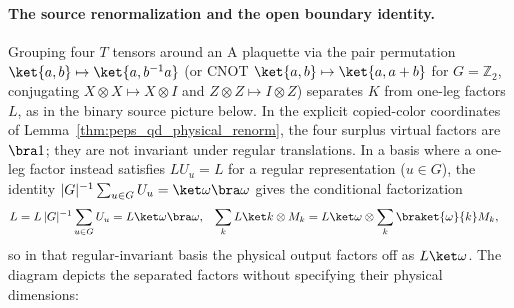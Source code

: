 \paragraph{The source renormalization and the open boundary identity.}
Grouping four $T$ tensors around an A plaquette via the pair permutation $\ket{a,b}\mapsto\ket{a,b^{-1}a}$ (or CNOT $\ket{a,b}\mapsto\ket{a,a+b}$ for $G=\mathbb Z_2$, conjugating $X\otimes X\mapsto X\otimes I$ and $Z\otimes Z\mapsto I\otimes Z$) separates $K$ from one-leg factors $L$, as in the binary source picture below. In the explicit copied-color coordinates of Lemma~\ref{thm:peps_qd_physical_renorm}, the four surplus virtual factors are $\bra1$; they are not invariant under regular translations. In a basis where a one-leg factor instead satisfies $LU_u=L$ for a regular representation ($u\in G$), the identity $|G|^{-1}\sum_{u\in G}U_u=\ket\omega\bra\omega$ gives the conditional factorization
\begin{align}
    L                        & =L\,|G|^{-1}\sum_{u\in G}U_u=L\ket\omega\bra\omega, &
    \sum_kL\ket k\otimes M_k & =L\ket\omega\otimes
    \sum_k\braket{\omega}{k}M_k, \notag
\end{align}
so in that regular-invariant basis the physical output factors off as $L\ket\omega$. The diagram depicts the separated factors without specifying their physical dimensions:
